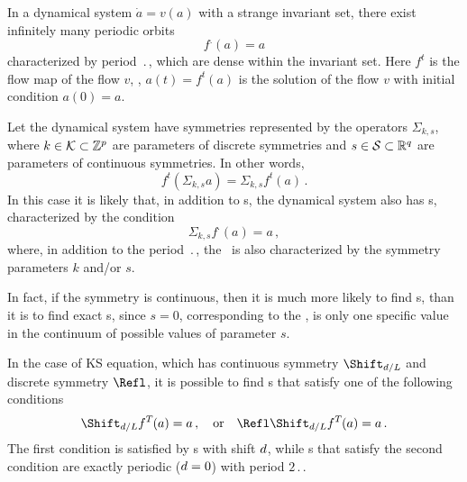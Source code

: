 


In a dynamical system $\dot{a} = v(a)$ with a strange invariant set, there exist
infinitely many periodic orbits
\[ f^\period{}(a) = a \]
characterized by period $\period{}$, which are dense within the invariant set.
Here $f^t$ is the flow map of the flow $v$, \ie, $a(t) = f^t(a)$ is the
solution of the flow $v$ with initial condition $a(0) = a$.

Let the dynamical system have symmetries represented by the operators
$\Sigma_{k,s}$, where $k \in {\cal K} \subset \mathbb{Z}^p$ are
parameters of discrete symmetries and $s \in {\cal S} \subset \mathbb{R}^q$
are parameters of continuous symmetries.  In other words,
\[ f^t(\Sigma_{k,s} a) = \Sigma_{k,s} f^t(a)\,. \]
In this case it is likely that, in addition to \po s, the dynamical system also
has \rpo s, characterized by the condition
\[ \Sigma_{k,s}f^\period{}(a) = a\,, \]
where, in addition to the period $\period{}$, the \rpo\ is also characterized by
the symmetry parameters $k$ and/or $s$.

In fact, if the symmetry is continuous, then it is much more likely
to find \rpo s, than it is to find exact \po s, since $s = 0$,
corresponding to the \po , is only one specific value in the
continuum of possible values of parameter $s$.

In the case of KS equation, which has continuous symmetry
$\Shift_{\shift/L}$ and discrete symmetry $\Refl$, it is possible to
find \rpo s that satisfy one of the following conditions
\[
  \Shift_{\shift/L}f^\period{}(a) = a\,,
\quad\mbox{or}\quad
  \Refl\Shift_{\shift/L}f^\period{}(a) = a\,.
\]
The first condition is satisfied by \rpo s with shift $d$,
while \rpo s that satisfy the second condition are exactly periodic
($d = 0$) with period $2\period{}$.
